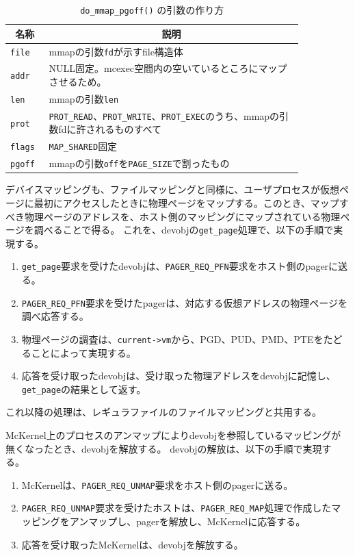 \documentclass[twoside,11pt,fleqn]{book}
\newcounter{subsubsubsection}[subsubsection]
\begin{document}
{\begin{table}[!htb]
\centering
\footnotesize
\caption{\texttt{do\_mmap\_pgoff()} の引数の作り方}\vspace{0.0em}
\label{tab:do_mmap_pgoff_options}
\begin{tabular}{|p{0.10\linewidth}|p{0.75\linewidth}|} \hline
\multicolumn{1}{|c}{\textbf{名称}}&\multicolumn{1}{|c|}{\textbf{説明}}\\ \hline \hline
\texttt{file}&mmapの引数\texttt{fd}が示すfile構造体\\ \hline
\texttt{addr}&NULL固定。mcexec空間内の空いているところにマップさせるため。\\ \hline
\texttt{len}&mmapの引数\texttt{len}\\ \hline
\texttt{prot}&\texttt{PROT\_READ}、\texttt{PROT\_WRITE}、\texttt{PROT\_EXEC}のうち、mmapの引数fdに許されるものすべて\\ \hline
\texttt{flags}&\texttt{MAP\_SHARED}固定\\ \hline
\texttt{pgoff}&mmapの引数\texttt{off}を\texttt{PAGE\_SIZE}で割ったもの\\ \hline
\end{tabular}
\vspace{-0em}
\end{table}
\FloatBarrier

デバイスマッピングも、ファイルマッピングと同様に、ユーザプロセスが仮想ページに最初にアクセスしたときに物理ページをマップする。このとき、マップすべき物理ページのアドレスを、ホスト側のマッピングにマップされている物理ページを調べることで得る。
これを、devobjの\texttt{get\_page}処理で、以下の手順で実現する。
\begin{enumerate}
\item \texttt{get\_page}要求を受けたdevobjは、\texttt{PAGER\_REQ\_PFN}要求をホスト側のpagerに送る。
\item \texttt{PAGER\_REQ\_PFN}要求を受けたpagerは、対応する仮想アドレスの物理ページを調べ応答する。
\item 物理ページの調査は、\texttt{current->vm}から、PGD、PUD、PMD、PTEをたどることによって実現する。
\item 応答を受け取ったdevobjは、受け取った物理アドレスをdevobjに記憶し、\texttt{get\_page}の結果として返す。
\end{enumerate}
これ以降の処理は、レギュラファイルのファイルマッピングと共用する。

McKernel上のプロセスのアンマップによりdevobjを参照しているマッピングが無くなったとき、devobjを解放する。
devobjの解放は、以下の手順で実現する。
\begin{enumerate}
\item McKernelは、\texttt{PAGER\_REQ\_UNMAP}要求をホスト側のpagerに送る。
\item \texttt{PAGER\_REQ\_UNMAP}要求を受けたホストは、\texttt{PAGER\_REQ\_MAP}処理で作成したマッピングをアンマップし、pagerを解放し、McKernelに応答する。
\item 応答を受け取ったMcKernelは、devobjを解放する。
\end{enumerate}
}
\end{document}
